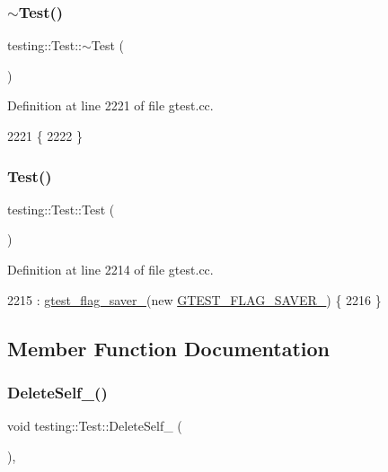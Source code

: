\subsubsection{\texorpdfstring{$\sim$\+Test()}{~Test()}}
{\footnotesize\ttfamily testing\+::\+Test\+::$\sim$\+Test (\begin{DoxyParamCaption}{ }\end{DoxyParamCaption})\hspace{0.3cm}{\ttfamily [virtual]}}



Definition at line 2221 of file gtest.\+cc.


\begin{DoxyCode}
2221             \{
2222 \}
\end{DoxyCode}
\mbox{\label{classtesting_1_1Test_a68b7618abd1fc6d13382738b0d3b5c7c}} 
\subsubsection{\texorpdfstring{Test()}{Test()}}
{\footnotesize\ttfamily testing\+::\+Test\+::\+Test (\begin{DoxyParamCaption}{ }\end{DoxyParamCaption})\hspace{0.3cm}{\ttfamily [protected]}}



Definition at line 2214 of file gtest.\+cc.


\begin{DoxyCode}
2215     : \hyperlink{classtesting_1_1Test_a132c542f6932107234988d05a9980e49}{gtest\_flag\_saver\_}(\textcolor{keyword}{new} \hyperlink{gtest-port_8h_a3749ef4fba6b3c3993609b336031644d}{GTEST\_FLAG\_SAVER\_}) \{
2216 \}
\end{DoxyCode}


\subsection{Member Function Documentation}
\mbox{\label{classtesting_1_1Test_a3116f1f98ac889b11f1e3d981b8c6ca1}} 
\subsubsection{\texorpdfstring{Delete\+Self\+\_\+()}{DeleteSelf\_()}}
{\footnotesize\ttfamily void testing\+::\+Test\+::\+Delete\+Self\+\_\+ (\begin{DoxyParamCaption}{ }\end{DoxyParamCaption})\hspace{0.3cm}{\ttfamily [inline]}, {\ttfamily [private]}}



